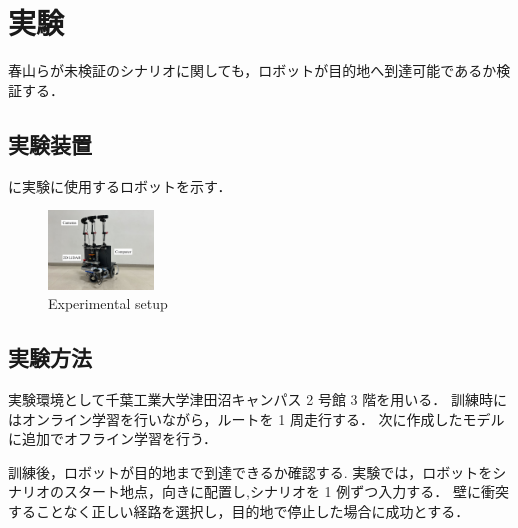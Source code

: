 \documentclass[10pt]{jarticle}
\begin{document}
    \section{実験}%
    春山らが未検証のシナリオに関しても，ロボットが目的地へ到達可能であるか検証する．
    \subsection{実験装置}
    に実験に使用するロボットを示す．
    
    \begin{figure}[h]
        \centering
        \includegraphics[width=0.25\textwidth]{./fig/ishiguro/gamma.pdf}
        \vspace{-1zh}
        \caption{Experimental setup}
        \label{fig:gamma}
    \end{figure}
    
    \subsection{実験方法}
    実験環境として千葉工業大学津田沼キャンパス 2 号館 3 階を用いる．
    訓練時にはオンライン学習を行いながら，ルートを 1 周走行する．
    次に作成したモデルに追加でオフライン学習を行う．   

    訓練後，ロボットが目的地まで到達できるか確認する.
    実験では，ロボットをシナリオのスタート地点，向きに配置し,シナリオを 1 例ずつ入力する．
    壁に衝突することなく正しい経路を選択し，目的地で停止した場合に成功とする．
\end{document}

